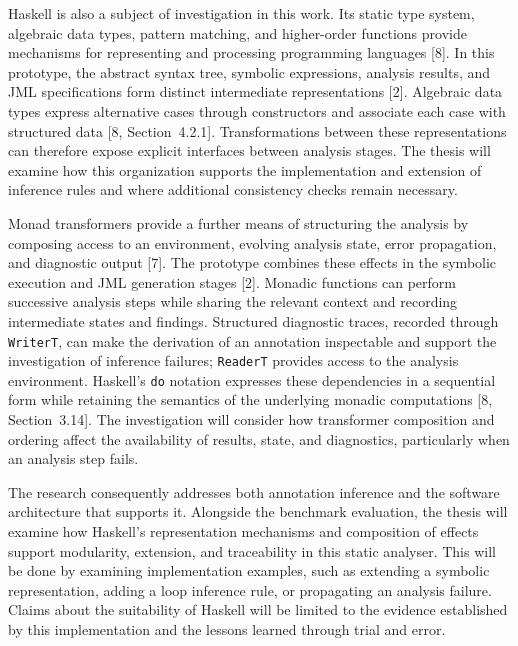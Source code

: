 \documentclass[11pt,a4paper]{article}
\begin{document}
Haskell is also a subject of investigation in this work. Its static type system, algebraic data types, pattern matching, and higher-order functions provide mechanisms for representing and processing programming languages [8]. In this prototype, the abstract syntax tree, symbolic expressions, analysis results, and JML specifications form distinct intermediate representations [2]. Algebraic data types express alternative cases through constructors and associate each case with structured data [8, Section~4.2.1]. Transformations between these representations can therefore expose explicit interfaces between analysis stages. The thesis will examine how this organization supports the implementation and extension of inference rules and where additional consistency checks remain necessary.

Monad transformers provide a further means of structuring the analysis by composing access to an environment, evolving analysis state, error propagation, and diagnostic output [7]. The prototype combines these effects in the symbolic execution and JML generation stages [2]. Monadic functions can perform successive analysis steps while sharing the relevant context and recording intermediate states and findings. Structured diagnostic traces, recorded through \texttt{WriterT}, can make the derivation of an annotation inspectable and support the investigation of inference failures; \texttt{ReaderT} provides access to the analysis environment. Haskell's \texttt{do} notation expresses these dependencies in a sequential form while retaining the semantics of the underlying monadic computations [8, Section~3.14]. The investigation will consider how transformer composition and ordering affect the availability of results, state, and diagnostics, particularly when an analysis step fails.

The research consequently addresses both annotation inference and the software architecture that supports it. Alongside the benchmark evaluation, the thesis will examine how Haskell's representation mechanisms and composition of effects support modularity, extension, and traceability in this static analyser. This will be done by examining implementation examples, such as extending a symbolic representation, adding a loop inference rule, or propagating an analysis failure. Claims about the suitability of Haskell will be limited to the evidence established by this implementation and the lessons learned through trial and error.
\end{document}
